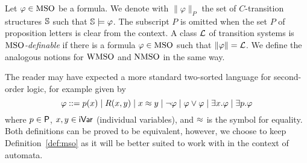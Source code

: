 Let $\varphi\in \mathrm{MSO}$ be a formula. We denote with $\|\varphi \|_P$ the set
of $C$-transition structures $\mathbb{S}$ such that $\mathbb{S}\models \varphi$.
The subscript $P$ is omitted when the set $P$ of proposition letters is clear
from the context.
A class $\mathcal{L}$ of transition systems is $\mathrm{MSO}$\emph{-definable} if there
is a formula $\varphi \in \mathrm{MSO}$ such that $\| \varphi \| = \mathcal{L}$.
We define the analogous notions for $\mathrm{WMSO}$ and $\mathrm{NMSO}$ in the same way.



\begin{remark}
The reader may have expected a more standard two-sorted language for second-order logic, for example given by
%
$$
\varphi ::= p(x)
\mid R(x,y)
\mid x \approx y
\mid \neg \varphi
\mid \varphi \lor \varphi
\mid \exists x.\varphi
\mid \exists p.\varphi
$$%
where $p \in \mathsf{P}$, $x,y \in \mathsf{iVar}$ (individual variables), %
and $\approx$ is the symbol for equality.
Both definitions can be proved to be equivalent, however, we choose to keep Definition~\ref{def:mso} as it will be better suited to work with in the context of automata.
\end{remark}

